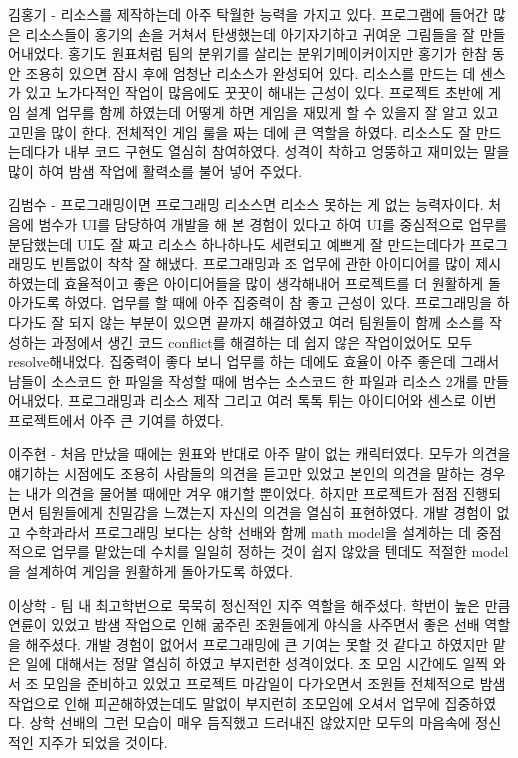 \documentclass[10pt,oneside,a4paper,titlepage]{article}
\begin{document}
김홍기 - 리소스를 제작하는데 아주 탁월한 능력을 가지고 있다. 프로그램에 들어간 많은 리소스들이 홍기의 손을 거쳐서 탄생했는데 아기자기하고 귀여운 그림들을 잘 만들어내었다. 홍기도 원표처럼 팀의 분위기를 살리는 분위기메이커이지만 홍기가 한참 동안 조용히 있으면 잠시 후에 엄청난 리소스가 완성되어 있다. 리소스를 만드는 데 센스가 있고 노가다적인 작업이 많음에도 꿋꿋이 해내는 근성이 있다. 프로젝트 초반에 게임 설계 업무를 함께 하였는데 어떻게 하면 게임을 재밌게 할 수 있을지 잘 알고 있고 고민을 많이 한다. 전체적인 게임 룰을 짜는 데에 큰 역할을 하였다. 리소스도 잘 만드는데다가 내부 코드 구현도 열심히 참여하였다. 
성격이 착하고 엉뚱하고 재미있는 말을 많이 하여 밤샘 작업에 활력소를 불어 넣어 주었다. 


김범수 - 프로그래밍이면 프로그래밍 리소스면 리소스 못하는 게 없는 능력자이다. 처음에 범수가 UI를 담당하여 개발을 해 본 경험이 있다고 하여 UI를 중심적으로 업무를 분담했는데 UI도 잘 짜고 리소스 하나하나도 세련되고 예쁘게 잘 만드는데다가 프로그래밍도 빈틈없이 착착 잘 해냈다. 프로그래밍과 조 업무에 관한 아이디어를 많이 제시하였는데 효율적이고 좋은 아이디어들을 많이 생각해내어 프로젝트를 더 원활하게 돌아가도록 하였다. 
업무를 할 때에 아주 집중력이 참 좋고 근성이 있다. 프로그래밍을 하다가도 잘 되지 않는 부분이 있으면 끝까지 해결하였고 여러 팀원들이 함께 소스를 작성하는 과정에서 생긴 코드 conflict를 해결하는 데 쉽지 않은 작업이었어도 모두 resolve해내었다. 집중력이 좋다 보니 업무를 하는 데에도 효율이 아주 좋은데 그래서 남들이 소스코드 한 파일을 작성할 때에 범수는 소스코드 한 파일과 리소스 2개를 만들어내었다. 프로그래밍과 리소스 제작 그리고 여러 톡톡 튀는 아이디어와 센스로 이번 프로젝트에서 아주 큰 기여를 하였다.

이주현 - 처음 만났을 때에는 원표와 반대로 아주 말이 없는 캐릭터였다. 모두가 의견을 얘기하는 시점에도 조용히 사람들의 의견을 듣고만 있었고 본인의 의견을 말하는 경우는 내가 의견을 물어볼 때에만 겨우 얘기할 뿐이었다. 하지만 프로젝트가 점점 진행되면서 팀원들에게 친밀감을 느꼈는지 자신의 의견을 열심히 표현하였다. 
개발 경험이 없고 수학과라서 프로그래밍 보다는 상학 선배와 함께 math model을 설계하는 데 중점적으로 업무를 맡았는데 수치를 일일히 정하는 것이 쉽지 않았을 텐데도 적절한 model을 설계하여 게임을 원활하게 돌아가도록 하였다.

이상학 - 팀 내 최고학번으로 묵묵히 정신적인 지주 역할을 해주셨다. 학번이 높은 만큼 연륜이 있었고 밤샘 작업으로 인해 굶주린 조원들에게 야식을 사주면서 좋은 선배 역할을 해주셨다. 
개발 경험이 없어서 프로그래밍에 큰 기여는 못할 것 같다고 하였지만 맡은 일에 대해서는 정말 열심히 하였고 부지런한 성격이었다. 조 모임 시간에도 일찍 와서 조 모임을 준비하고 있었고 프로젝트 마감일이 다가오면서 조원들 전체적으로 밤샘 작업으로 인해 피곤해하였는데도 말없이 부지런히 조모임에 오셔서 업무에 집중하였다. 상학 선배의 그런 모습이 매우 듬직했고 드러내진 않았지만 모두의 마음속에 정신적인 지주가 되었을 것이다.
\end{document}
